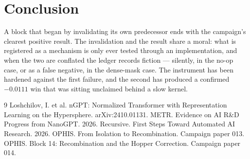 \documentclass{article}
\begin{document}
\section{Conclusion}
A block that began by invalidating its own predecessor ends with the campaign's clearest positive result. The invalidation and the result share a moral: what is registered as a mechanism is only ever tested through an implementation, and when the two are conflated the ledger records fiction --- silently, in the no-op case, or as a false negative, in the dense-mask case. The instrument has been hardened against the first failure, and the second has produced a confirmed $-0.0111$ win that was sitting unclaimed behind a slow kernel.


\begin{thebibliography}{9}
 Loshchilov, I. et al. nGPT: Normalized Transformer with Representation Learning on the Hypersphere. arXiv:2410.01131.
 METR. Evidence on AI R\&D Progress from NanoGPT. 2026.
 Recursive. First Steps Toward Automated AI Research. 2026.
 OPHIS. From Isolation to Recombination. Campaign paper 013.
 OPHIS. Block 14: Recombination and the Hopper Correction. Campaign paper 014.
\end{thebibliography}
\end{document}
